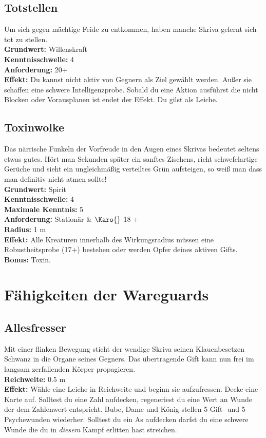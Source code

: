 \subsection*{Totstellen} \label{sk:totstellen}
Um sich gegen mächtige Feide zu entkommen, haben manche Skriva gelernt sich tot zu stellen. \\
\textbf{Grundwert:} Willenskraft \\
\textbf{Kenntnisschwelle:} 4 \\
\textbf{Anforderung:} 20+ \\
\textbf{Effekt:} Du kannst nicht aktiv von Gegnern als Ziel gewählt werden. Außer sie schaffen eine schwere Intelligenzprobe. Sobald du eine Aktion ausführst die nicht Blocken oder Vorausplanen ist endet der Effekt. Du gilst als Leiche.

\subsection*{Toxinwolke} \label{sk:toxinwolke}
Das närrische Funkeln der Vorfreude in den Augen eines Skrivas bedeutet seltens etwas gutes. Hört man Sekunden später ein sanftes Zischens, richt schwefelartige Gerüche und sieht ein ungleichmäßig verteiltes Grün aufsteigen, so weiß man dass man definitiv nicht atmen sollte! \\
\textbf{Grundwert:} Spirit \\
\textbf{Kenntnisschwelle:} 4 \\
\textbf{Maximale Kenntnis:} 5 \\
\textbf{Anforderung:} Stationär \& $\Karo{}$ 18 +\\
\textbf{Radius:} 1 m \\
\textbf{Effekt:} Alle Kreaturen innerhalb des Wirkungsradius müssen eine Robustheitsprobe (17+) bestehen oder werden Opfer deines aktiven Gifts.
\textbf{Bonus:} Toxin.


\section{Fähigkeiten der Wareguards} \label{wareguardskills}

\subsection*{Allesfresser} \label{sk:allesfresser}
Mit einer flinken Bewegung sticht der wendige Skriva seinen Klauenbesetzen Schwanz in die Organe seines Gegners. Das übertragende Gift kann nun frei im langsam zerfallenden Körper propagieren.\\
\textbf{Reichweite:} 0.5 m \\
\textbf{Effekt:} Wähle eine Leiche in Reichweite und beginn sie aufzufressen. Decke eine Karte auf. Solltest du eine Zahl aufdecken, regeneriest du eine Wert an Wunde der dem Zahlenwert entspricht. Bube, Dame und König stellen 5 Gift- und 5 Psychewunden wiederher. Solltest du ein As aufdecken darfst du eine schwere Wunde die du in \textit{diesem} Kampf erlitten hast streichen.

